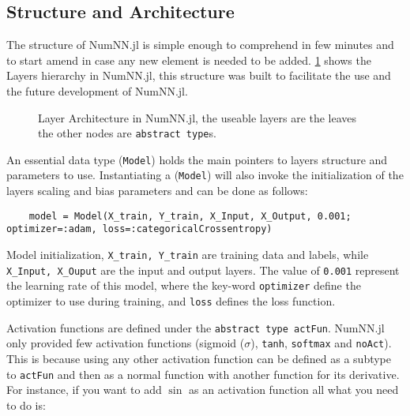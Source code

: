 
\subsection{Structure and Architecture}\label{subsec:saa}

The structure of NumNN.jl is simple enough to comprehend in few minutes and to start amend in case any new element is needed to be added. \figurename\ref{fig:layerstruct} shows the Layers hierarchy in NumNN.jl, this structure was built to facilitate the use and the future development of NumNN.jl.

\begin{figure}[!ht]
	\centering
		
	\caption{Layer Architecture in NumNN.jl, the useable layers are the leaves the other nodes are \texttt{abstract type}s.}\label{fig:layerstruct}
\end{figure}

An essential data type (\texttt{Model}) holds the main pointers to layers structure and parameters to use. Instantiating a (\texttt{Model}) will also invoke the initialization of the layers scaling and bias parameters and can be done as follows:

\begin{listing}[H]
	\begin{verbatim}
	model = Model(X_train, Y_train, X_Input, X_Output, 0.001; optimizer=:adam, loss=:categoricalCrossentropy)
	\end{verbatim}
	\caption{Model initialization, \texttt{X_train, Y_train} are training data and labels, while \texttt{X_Input, X_Ouput} are the input and output layers. The value of \texttt{0.001} represent the learning rate of this model, where the key-word \texttt{optimizer} define the optimizer to use during training, and \texttt{loss} defines the loss function.}\label{modelinit}
\end{listing}

Activation functions are defined under the \texttt{abstract type actFun}. NumNN.jl only provided few activation functions (sigmoid ($\sigma$), \texttt{tanh}, \texttt{softmax} and \texttt{noAct}). This is because using any other activation function can be defined as a subtype to \texttt{actFun} and then as a normal function with another function for its derivative. For instance, if you want to add $\sin$ as an activation function all what you need to do is:

